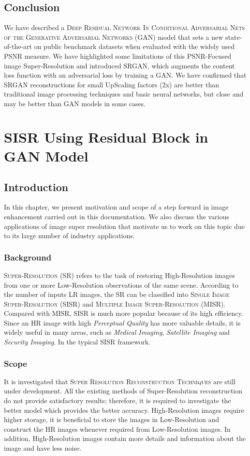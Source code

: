 \documentclass[12pt]{article}
\begin{document}
		\subsection{Conclusion}
			We have described a \textsc{Deep Residual Network In Conditional Adversarial Nets of the Generative Adversarial Networks} (GAN) model that sets a new state-of-the-art on public benchmark datasets when evaluated with the widely used PSNR measure. We have highlighted some limitations of this PSNR-Focused image Super-Resolution and introduced SRGAN, which augments the content loss function with an adversarial loss by training a GAN. We have confirmed that SRGAN reconstructions for small UpScaling factors (2x) are better than traditional image processing techniques and basic neural networks, but close and may be better than GAN models in some cases.
			
	\clearpage
	\section{SISR Using Residual Block in GAN Model}
		\subsection{Introduction}
			In this chapter, we present motivation and scope of a step forward in image enhancement carried out in this documentation. We also discuss the various applications of image super resolution that motivate us to work on this topic due to its large number of industry applications.
			\subsubsection{Background}
				\textsc{Super-Resolution} (SR) refers to the task of restoring High-Resolution images from one or more Low-Resolution observations of the same scene. According to the number of inputs LR images, the SR can be classified into \textsc{Single Image Super-Resolution} (SISR) and \textsc{Multiple Image Super-Resolution} (MISR). Compared with MISR, SISR is much more popular because of its high efficiency. Since an HR image with high \textit{Perceptual Quality} has more valuable details, it is widely useful in many areas, such as \textit{Medical Imaging}, \textit{Satellite Imaging} and \textit{Security Imaging}. In the typical SISR framework.
			\subsubsection{Scope}
				It is investigated that \textsc{Super Resolution Reconstruction Techniques} are still under development. All the existing methods of Super-Resolution reconstruction do not provide satisfactory results; therefore, it is required to investigate the better model which provides the better accuracy. High-Resolution images require higher storage, it is beneficial to store the images in Low-Resolution and construct the HR images whenever required from Low-Resolution images. In addition, High-Resolution images contain more details and information about the image and have less noise.
				
\end{document}
